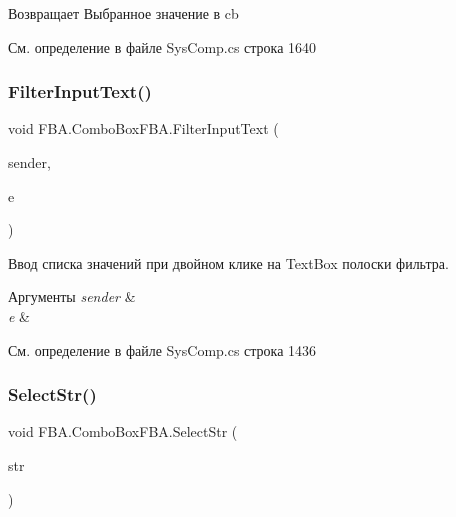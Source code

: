 \begin{DoxyReturn}{Возвращает}
Выбранное значение в cb
\end{DoxyReturn}


См. определение в файле Sys\+Comp.\+cs строка 1640

\mbox{\label{class_f_b_a_1_1_combo_box_f_b_a_a3c00e477f47e26bdaad144eeb0e1ca07}} 
\subsubsection{\texorpdfstring{Filter\+Input\+Text()}{FilterInputText()}}
{\footnotesize\ttfamily void F\+B\+A.\+Combo\+Box\+F\+B\+A.\+Filter\+Input\+Text (\begin{DoxyParamCaption}\item[{object}]{sender,  }\item[{Mouse\+Event\+Args}]{e }\end{DoxyParamCaption})}



Ввод списка значений при двойном клике на Text\+Box полоски фильтра. 


\begin{DoxyParams}{Аргументы}
{\em sender} & \\
\hline
{\em e} & \\
\hline
\end{DoxyParams}


См. определение в файле Sys\+Comp.\+cs строка 1436

\mbox{\label{class_f_b_a_1_1_combo_box_f_b_a_a5c209c5dbfdf27b8239b1aeb58aaf539}} 
\subsubsection{\texorpdfstring{Select\+Str()}{SelectStr()}}
{\footnotesize\ttfamily void F\+B\+A.\+Combo\+Box\+F\+B\+A.\+Select\+Str (\begin{DoxyParamCaption}\item[{string}]{str }\end{DoxyParamCaption})}



